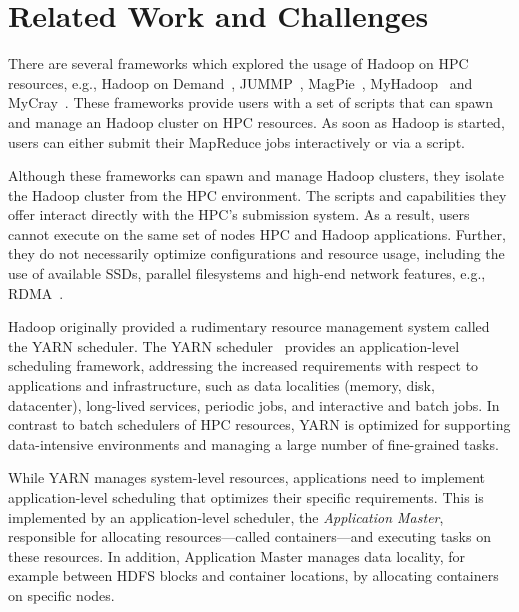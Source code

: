 \section{Related Work and Challenges}
\label{sec:hpc_hadoop_rel}

There are several frameworks which explored the usage of Hadoop on HPC
resources, e.g., Hadoop on Demand~\cite{hod}, JUMMP~\cite{moody2013jummp},
MagPie~\cite{chu2015magpie}, MyHadoop~\cite{krishnan2011myhadoop} and
MyCray~\cite{mycray}. These frameworks provide users with a set of scripts that
can spawn and manage an Hadoop cluster on HPC resources. As soon as Hadoop is
started, users can either submit their MapReduce jobs interactively or via a
script.

Although these frameworks can spawn and manage Hadoop clusters, they isolate the
Hadoop cluster from the HPC environment. The scripts and capabilities they offer
interact directly with the HPC's submission system. As a result, users cannot
execute on the same set of nodes HPC and Hadoop applications. Further, they do
not necessarily optimize configurations and resource usage, including the use of
available SSDs, parallel filesystems and high-end network features, e.g.,
RDMA~\cite{rahman2014homr}.

Hadoop originally provided a rudimentary resource management system called the
YARN scheduler. The YARN scheduler~\cite{vavilapalli2013apache} provides an
application-level scheduling framework, addressing the increased requirements
with respect to applications and infrastructure, such as data localities
(memory, disk, datacenter), long-lived services, periodic jobs, and interactive
and batch jobs. In contrast to batch schedulers of HPC resources, YARN is
optimized for supporting data-intensive environments and managing a large number
of fine-grained tasks.

While YARN manages system-level resources, applications need to implement
application-level scheduling that optimizes their specific requirements. This is
implemented by an application-level scheduler, the \textit{Application Master},
responsible for allocating resources---called containers---and executing tasks
on these resources. In addition, Application Master manages data locality, for
example between HDFS blocks and container locations, by allocating containers on
specific nodes.

